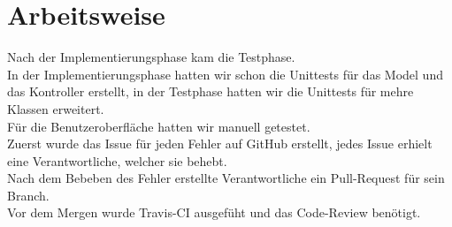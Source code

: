 \section{Arbeitsweise}
Nach der Implementierungsphase kam die Testphase.\\
In der Implementierungsphase hatten wir schon die Unittests für das Model und das Kontroller erstellt, in der Testphase hatten wir die Unittests für mehre Klassen erweitert.\\
Für die Benutzeroberfläche hatten wir manuell getestet.\\
Zuerst wurde das Issue für jeden Fehler auf GitHub erstellt, jedes Issue erhielt eine Verantwortliche, welcher sie behebt.\\
Nach dem Bebeben des Fehler erstellte Verantwortliche ein Pull-Request für sein Branch.\\ 
Vor dem Mergen wurde Travis-CI ausgefüht und das Code-Review benötigt.\\
